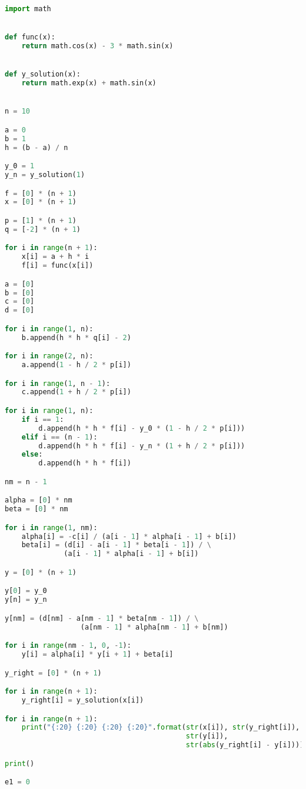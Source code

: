 \documentclass [12pt]{article}
\begin{document}
\begin{lstlisting}[language=python]
import math


def func(x):
    return math.cos(x) - 3 * math.sin(x)


def y_solution(x):
    return math.exp(x) + math.sin(x)


n = 10

a = 0
b = 1
h = (b - a) / n

y_0 = 1
y_n = y_solution(1)

f = [0] * (n + 1)
x = [0] * (n + 1)

p = [1] * (n + 1)
q = [-2] * (n + 1)

for i in range(n + 1):
    x[i] = a + h * i
    f[i] = func(x[i])

a = [0]
b = [0]
c = [0]
d = [0]

for i in range(1, n):
    b.append(h * h * q[i] - 2)

for i in range(2, n):
    a.append(1 - h / 2 * p[i])

for i in range(1, n - 1):
    c.append(1 + h / 2 * p[i])

for i in range(1, n):
    if i == 1:
        d.append(h * h * f[i] - y_0 * (1 - h / 2 * p[i]))
    elif i == (n - 1):
        d.append(h * h * f[i] - y_n * (1 + h / 2 * p[i]))
    else:
        d.append(h * h * f[i])

nm = n - 1

alpha = [0] * nm
beta = [0] * nm

for i in range(1, nm):
    alpha[i] = -c[i] / (a[i - 1] * alpha[i - 1] + b[i])
    beta[i] = (d[i] - a[i - 1] * beta[i - 1]) / \
              (a[i - 1] * alpha[i - 1] + b[i])

y = [0] * (n + 1)

y[0] = y_0
y[n] = y_n

y[nm] = (d[nm] - a[nm - 1] * beta[nm - 1]) / \
                  (a[nm - 1] * alpha[nm - 1] + b[nm])

for i in range(nm - 1, 0, -1):
    y[i] = alpha[i] * y[i + 1] + beta[i]

y_right = [0] * (n + 1)

for i in range(n + 1):
    y_right[i] = y_solution(x[i])

for i in range(n + 1):
    print("{:20} {:20} {:20} {:20}".format(str(x[i]), str(y_right[i]),
                                           str(y[i]),
                                           str(abs(y_right[i] - y[i]))))

print()

e1 = 0


\end{lstlisting}
\end{document}
